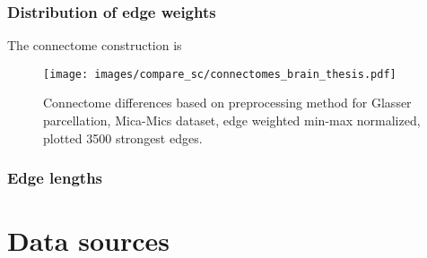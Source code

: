 \subsubsection{Distribution of edge weights}

The connectome construction is 

\begin{figure}
  \begin{center}
  \end{center}
  \caption[\TODO]{\TODO}
  \label{fig:edge_weights}
\end{figure}


\begin{figure}
  \begin{center}
    \texttt{[image: images/compare\_sc/connectomes\_brain\_thesis.pdf]}
  \end{center}
  \caption[Connectome differences based on preprocessing method]{Connectome differences based on preprocessing method for Glasser parcellation, Mica-Mics dataset, edge weighted min-max normalized, plotted 3500 strongest edges.}
  \label{fig:edge_weights}
\end{figure}

\subsubsection{Edge lengths}


\section{Data sources}

